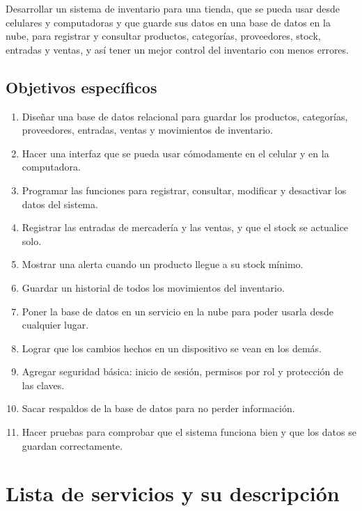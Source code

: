 \documentclass[12pt,a4paper]{article}
\begin{document}
Desarrollar un sistema de inventario para una tienda, que se pueda usar desde celulares y computadoras y que guarde sus datos en una base de datos en la nube, para registrar y consultar productos, categorías, proveedores, stock, entradas y ventas, y así tener un mejor control del inventario con menos errores.

\subsection{Objetivos específicos}

\begin{enumerate}
    \item Diseñar una base de datos relacional para guardar los productos, categorías, proveedores, entradas, ventas y movimientos de inventario.
    \item Hacer una interfaz que se pueda usar cómodamente en el celular y en la computadora.
    \item Programar las funciones para registrar, consultar, modificar y desactivar los datos del sistema.
    \item Registrar las entradas de mercadería y las ventas, y que el stock se actualice solo.
    \item Mostrar una alerta cuando un producto llegue a su stock mínimo.
    \item Guardar un historial de todos los movimientos del inventario.
    \item Poner la base de datos en un servicio en la nube para poder usarla desde cualquier lugar.
    \item Lograr que los cambios hechos en un dispositivo se vean en los demás.
    \item Agregar seguridad básica: inicio de sesión, permisos por rol y protección de las claves.
    \item Sacar respaldos de la base de datos para no perder información.
    \item Hacer pruebas para comprobar que el sistema funciona bien y que los datos se guardan correctamente.
\end{enumerate}

\section{Lista de servicios y su descripción}\label{sec:servicios}
\end{document}
